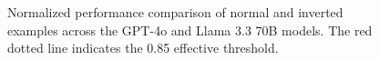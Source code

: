 \begin{figure}[t!]
    \centering
    \caption{Normalized performance comparison of normal and inverted examples across the GPT-4o and Llama 3.3 70B models. The red dotted line indicates the 0.85 effective threshold.}
    \label{fig:normal_vs_inverted}
\end{figure}